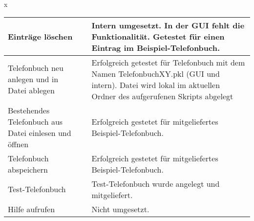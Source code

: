 \documentclass[a4paper]{article}
\begin{document}
\begin{exercise}{x}
\begin{center}
\begin{tabular}{| p{2.5cm} | p{2.2cm} | p{10cm} |}
		Eintr\"age l\"oschen & 
		& Intern umgesetzt. In der GUI fehlt die Funktionalit\"at.
		Getestet f\"ur einen Eintrag im Beispiel-Telefonbuch.\\ \hline
		
		Telefonbuch neu anlegen und in Datei ablegen & 
		& Erfolgreich getestet f\"ur Telefonbuch mit dem Namen TelefonbuchXY.pkl (GUI und intern).
		Datei wird lokal im aktuellen Ordner des aufgerufenen Skripts abgelegt \\ \hline
		
		Bestehendes Telefonbuch aus Datei einlesen und \"offnen & 
		& Erfolgreich gestetet f\"ur mitgeliefertes Beispiel-Telefonbuch. \\ \hline
		
		Telefonbuch abspeichern & 
		& Erfolgreich gestetet f\"ur mitgeliefertes Beispiel-Telefonbuch. \\ \hline
		
		Test-Telefonbuch &
		& Test-Telefonbuch wurde angelegt und mitgeliefert. \\ \hline
		
		Hilfe aufrufen & 
		&  Nicht umgesetzt. \\ \hline
		
	\end{tabular}
	
	
%	
%		
%				
%		
%		
%		
%		
%	
%				
%		
\end{center}

\end{exercise}


\end{document}
